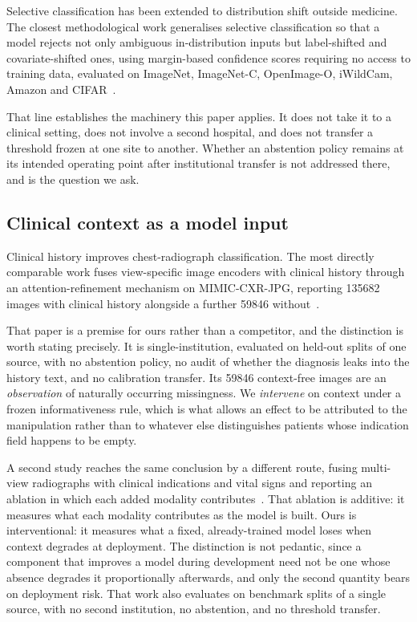 Selective classification has been extended to distribution shift outside
medicine. The closest methodological work generalises selective classification
so that a model rejects not only ambiguous in-distribution inputs but
label-shifted and covariate-shifted ones, using margin-based confidence scores
requiring no access to training data, evaluated on ImageNet, ImageNet-C,
OpenImage-O, iWildCam, Amazon and CIFAR~\cite{selective_shift_2025}.

That line establishes the machinery this paper applies. It does not take it to a
clinical setting, does not involve a second hospital, and does not transfer a
threshold frozen at one site to another. Whether an abstention policy remains at
its intended operating point after institutional transfer is not addressed
there, and is the question we ask.

\subsection{Clinical context as a model input}
\label{sec:rw-context}

Clinical history improves chest-radiograph classification. The most directly
comparable work fuses view-specific image encoders with clinical history through
an attention-refinement mechanism on MIMIC-CXR-JPG, reporting
\num{135682} images with clinical history alongside a further \num{59846}
without~\cite{yang2025mcxnet}.

That paper is a premise for ours rather than a competitor, and the distinction
is worth stating precisely. It is single-institution, evaluated on held-out
splits of one source, with no abstention policy, no audit of whether the
diagnosis leaks into the history text, and no calibration transfer. Its
\num{59846} context-free images are an \emph{observation} of naturally occurring
missingness. We \emph{intervene} on context under a frozen informativeness rule,
which is what allows an effect to be attributed to the manipulation rather than
to whatever else distinguishes patients whose indication field happens to be
empty.

A second study reaches the same conclusion by a different route, fusing
multi-view radiographs with clinical indications and vital signs and reporting
an ablation in which each added modality
contributes~\cite{sloan2025clinically}. That ablation is additive: it measures
what each modality contributes as the model is built. Ours is interventional: it
measures what a fixed, already-trained model loses when context degrades at
deployment. The distinction is not pedantic, since a component that improves a
model during development need not be one whose absence degrades it
proportionally afterwards, and only the second quantity bears on deployment
risk. That work also evaluates on benchmark splits of a single source, with no
second institution, no abstention, and no threshold transfer.

